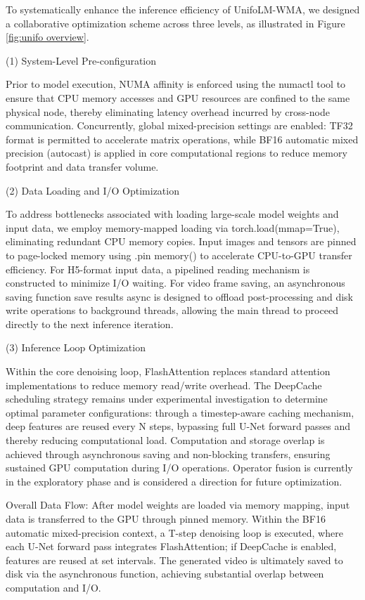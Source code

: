 To systematically enhance the inference efficiency of UnifoLM-WMA, we designed a collaborative optimization scheme across three levels, as illustrated in Figure \ref{fig:unifo overview}.

(1) System-Level Pre-configuration

Prior to model execution, NUMA affinity is enforced using the numactl tool to ensure that CPU memory accesses and GPU resources are confined to the same physical node, thereby eliminating latency overhead incurred by cross-node communication. 
Concurrently, global mixed-precision settings are enabled: TF32 format is permitted to accelerate matrix operations, while BF16 automatic mixed precision (autocast) is applied in core computational regions to reduce memory footprint and data transfer volume.

(2) Data Loading and I/O Optimization

To address bottlenecks associated with loading large-scale model weights and input data, we employ memory-mapped loading via torch.load(mmap=True), eliminating redundant CPU memory copies. Input images and tensors are pinned to page-locked memory using .pin memory() to accelerate CPU-to-GPU transfer efficiency. For H5-format input data, a pipelined reading mechanism is constructed to minimize I/O waiting. For video frame saving, an asynchronous saving function save results async is designed to offload post-processing and disk write operations to background threads, allowing the main thread to proceed directly to the next inference iteration.

(3) Inference Loop Optimization

Within the core denoising loop, FlashAttention replaces standard attention implementations to reduce memory read/write overhead. The DeepCache scheduling strategy remains under experimental investigation to determine optimal parameter configurations: through a timestep-aware caching mechanism, deep features are reused every N steps, bypassing full U-Net forward passes and thereby reducing computational load. Computation and storage overlap is achieved through asynchronous saving and non-blocking transfers, ensuring sustained GPU computation during I/O operations. Operator fusion is currently in the exploratory phase and is considered a direction for future optimization.

Overall Data Flow: After model weights are loaded via memory mapping, input data is transferred to the GPU through pinned memory. Within the BF16 automatic mixed-precision context, a T-step denoising loop is executed, where each U-Net forward pass integrates FlashAttention; if DeepCache is enabled, features are reused at set intervals. The generated video is ultimately saved to disk via the asynchronous function, achieving substantial overlap between computation and I/O.

